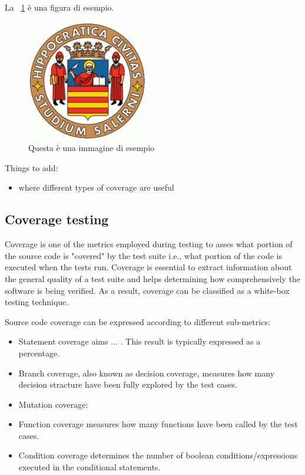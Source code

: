 La \figurename~\ref{fig:esempio} è una figura di esempio.

\begin{figure}[htbp]
    \centering
    \includegraphics[scale=0.7]{./figures/logo_standard.jpg}
    \caption{Questa è una immagine di esempio}
    \label{fig:esempio}
\end{figure}


Things to add:
\begin{itemize}
    \item where different types of coverage are useful
\end{itemize}


\subsection*{Coverage testing}
Coverage is one of the metrics employed during testing to asses what portion of the source code is "covered" by the test suite i.e., 
what portion of the code is executed when the tests run. Coverage is essential to extract information about the general quality of a test suite
and helps determining how comprehensively the software is being verified.
As a result, coverage can be classified as a white-box testing technique.


Source code coverage can be expressed according to different sub-metrics:
\begin {itemize}
    \item Statement coverage aims ... . This result is typically expressed as a percentage.
    \item Branch coverage, also known as decision coverage, measures how many decision stracture have been fully explored by the test cases.
    \item Mutation coverage:
    \item Function coverage measures how many functions have been called by the test cases.
    \item Condition coverage determines the number of boolean conditions/expressions executed in the conditional statements.
\end {itemize}

